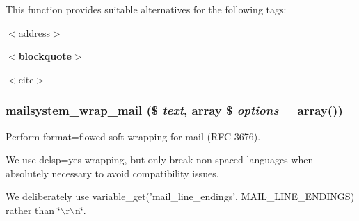 This function provides suitable alternatives for the following tags:

$<$address$>$ {\bfseries  $<$blockquote$>$ \par
  $<$cite$>$   
\begin{DoxyDescription}
\item[{\itshape         {\itshape      {\bfseries           The following tag attributes are supported:: Hyperlink destination urls.: Ordered list item numbers.: Ordered list start number.   \$string The string to be transformed.  \$allowed\_\-tags (optional) If supplied, a list of tags that will be transformed. If omitted, all supported tags are transformed.   The transformed string.   drupal\_\-mail() }\/}\/}]
\end{DoxyDescription}}\hypertarget{html__to__text_8inc_a7137e9a046abb0bc57ad54a580612474}{
\subsubsection[{mailsystem\_\-wrap\_\-mail}]{\setlength{\rightskip}{0pt plus 5cm}mailsystem\_\-wrap\_\-mail (\$ {\em text}, \/  array \$ {\em options} = {\ttfamily array()})}}
\label{html__to__text_8inc_a7137e9a046abb0bc57ad54a580612474}
Perform format=flowed soft wrapping for mail (RFC 3676).

We use delsp=yes wrapping, but only break non-\/spaced languages when absolutely necessary to avoid compatibility issues.

We deliberately use variable\_\-get('mail\_\-line\_\-endings', MAIL\_\-LINE\_\-ENDINGS) rather than \char`\"{}$\backslash$r$\backslash$n\char`\"{}.


